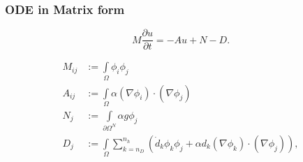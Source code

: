 \begin{frame}
\frametitle{ODE in Matrix form}
\begin{block}{}
\begin{equation*}
        M\frac{\partial u}{\partial t} = -A u + N - D.
\end{equation*}
\end{block}
\begin{align*}
        M_{ij} &:=\int\limits_{\Omega} \phi_i \phi_j \\
        A_{ij} &:=\int\limits_{\Omega} \alpha (\nabla \phi_i) \cdot (\nabla \phi_j) \\
        N_{j} &:=\int\limits_{\partial\Omega^N} \alpha g\phi_j \\
        D_{j} &:=\int\limits_{\Omega} \sum_{k=n_D}^{n_h}\left( \dot{d}_k \phi_k \phi_j  + \alpha d_k(\nabla \phi_k) \cdot (\nabla \phi_j)\right),
\end{align*}
\end{frame}